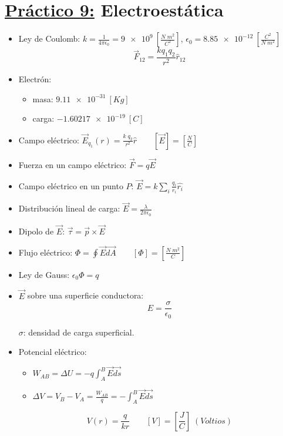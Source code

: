 \documentclass[12pt,a4paper]{article}
\newcommand{\PN}{\par\noindent}
\begin{document}
	\section*{\underline{Práctico 9:} Electroestática}
		\begin{multicols}{2}
			\begin{itemize}
				\item Ley de Coulomb: $k = \frac{1}{4 \pi \epsilon_{0}} = \SI{9e9}{} [\frac{N \; m^{2}}{C^{2}}] $,
					$\epsilon_{0} = \SI{8.85e-12}{} [\frac{C^{2}}{N \; m^{2}}]$
					\[
						\vec{F}_{12} = \frac{k q_{1} q_{2}}{r^{2}} \hat{r}_{12}
					\]
				\item Electrón:
					\begin{itemize}
						\item masa: $\SI{9.11e-31}{} [Kg]$
						\item carga: $- \SI{1.60217e-19}{} [C]$
					\end{itemize}
				\item Campo eléctrico: $\vec{E}_{q_{1}}(r) = \frac{k \; q_{2}}{r^{2}} \hat{r} \qquad [\vec{E}] = [\frac{N}{C}]$
				\item Fuerza en un campo eléctrico: $\vec{F} = q \vec{E}$
				\item Campo eléctrico en un punto $P$: $\vec{E} = k \sum_{i} \frac{q_{i}}{r_{i}} \hat{r_{i}}$
				\item Distribución lineal de carga: $\vec{E} = \frac{\lambda}{2\pi\epsilon_{0}}$
				\item Dipolo de $\vec{E}$: $\vec{\tau} = \vec{p} \times \vec{E}$
				\item Flujo eléctrico: $\Phi = \oint \vec{E} \vec{dA} \qquad [\Phi] = [\frac{N\; m^{2}}{C}]$
				\item Ley de Gauss: $\epsilon_{0} \Phi = q$
				\item $\vec{E}$ sobre una superficie conductora:
					\[
						E = \frac{\sigma}{\epsilon_{0}}
					\]
					\PN $\sigma$: densidad de carga superficial.
				\item Potencial eléctrico:
					\begin{itemize}
						\item $W_{AB} = \Delta U = -q \int_{A}^{B} \vec{E} \vec{ds}$
						\item $\Delta V = V_{B} - V_{A} = \frac{W_{AB}}{q} = - \int_{A}^{B} \vec{E} \vec{ds}$
					\end{itemize}
					\[
						V(r) = \frac{q}{kr} \qquad [V] = [\frac{J}{C}] \; (Voltios)
					\]
			\end{itemize}
		\end{multicols}
\end{document}
